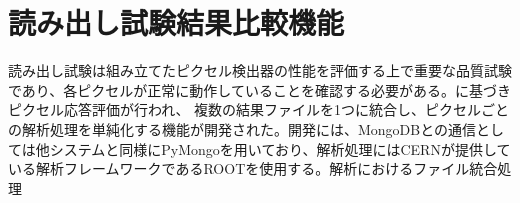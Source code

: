 \chapter{読み出し試験結果比較機能}

読み出し試験は組み立てたピクセル検出器の性能を評価する上で重要な品質試験であり、各ピクセルが正常に動作していることを確認する必要がある。に基づきピクセル応答評価が行われ、
複数の結果ファイルを1つに統合し、ピクセルごとの解析処理を単純化する機能が開発された。開発には、MongoDBとの通信としては他システムと同様にPyMongoを用いており、解析処理にはCERNが提供している解析フレームワークであるROOTを使用する。解析におけるファイル統合処理
